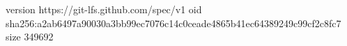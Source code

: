version https://git-lfs.github.com/spec/v1
oid sha256:a2ab6497a90030a3bb99ec7076c14c0ceade4865b41ec64389249c99cf2c8fc7
size 349692

